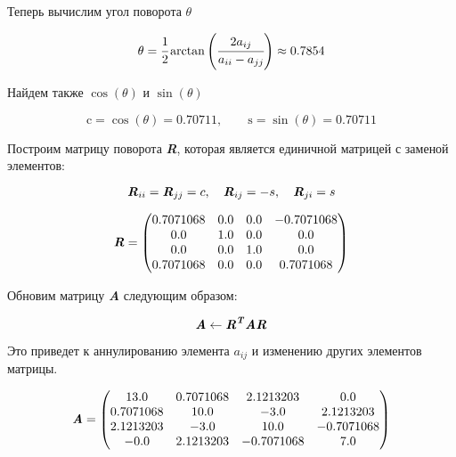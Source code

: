 \documentclass[a4paper, 14pt]{extarticle}
\begin{document}
Теперь вычислим угол поворота $\theta$

\begin{equation*}
  \theta = \cfrac{1}{2} \arctan \left( \cfrac{2 a_{ij}}{a_{ii} - a_{jj}} \right) \approx
  0.7854
\end{equation*}

Найдем также $\cos(\theta)$ и $\sin(\theta)$

\begin{equation*}
  \text{c} = \cos(\theta) = 0.70711, \qquad \text{s} = \sin(\theta) = 0.70711
\end{equation*}

Построим матрицу поворота \textbf{\textit{R}}, которая является единичной 
матрицей с заменой элементов:

\begin{equation*}
  \textbf{\textit{R}}_{ii} = \textbf{\textit{R}}_{jj} = c, \quad \textbf{\textit{R}}_{ij} = -s, \quad \textbf{\textit{R}}_{ji} = s
\end{equation*}

\begin{equation*}
  \textbf{\textit{R}} = \begin{pmatrix}
    0.7071068 & 0.0 & 0.0 & -0.7071068 \\
    0.0 & 1.0 & 0.0 & 0.0 \\
    0.0 & 0.0 & 1.0 & 0.0 \\
    0.7071068 & 0.0 & 0.0 & 0.7071068 \\
    \end{pmatrix}
\end{equation*}

Обновим матрицу \textbf{\textit{A}} следующим образом:

\begin{equation*}
  \textbf{\textit{A}} \leftarrow \textbf{\textit{R}}^{\textbf{\textit{T}}} 
  \textbf{\textit{A}} \textbf{\textit{R}}
\end{equation*}

Это приведет к аннулированию элемента $a_{ij}$ и изменению других элементов матрицы.

\begin{equation*}
  \textbf{\textit{A}} = \begin{pmatrix}
    13.0 & 0.7071068 & 2.1213203 & 0.0 \\
    0.7071068 & 10.0 & -3.0 & 2.1213203 \\
    2.1213203 & -3.0 & 10.0 & -0.7071068 \\
    -0.0 & 2.1213203 & -0.7071068 & 7.0 \\
    \end{pmatrix}
\end{equation*}
\end{document}
